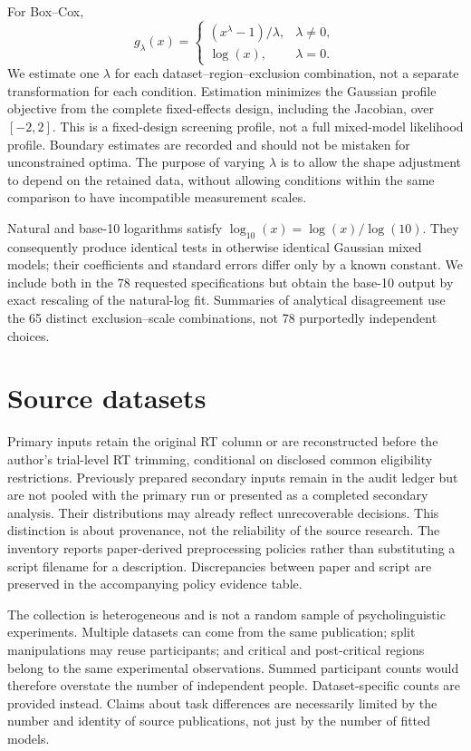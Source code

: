 For Box--Cox,
\[
 g_\lambda(x)=
 \begin{cases}
  (x^\lambda-1)/\lambda,&\lambda\neq0,\\
  \log(x),&\lambda=0.
 \end{cases}
\]
We estimate one \(\lambda\) for each dataset--region--exclusion combination,
not a separate transformation for each condition. Estimation minimizes the
Gaussian profile objective from the complete fixed-effects design, including
the Jacobian, over \([-2,2]\). This is a fixed-design screening profile,
not a full mixed-model likelihood profile. Boundary estimates are recorded
and should not be mistaken for unconstrained optima. The purpose of varying
\(\lambda\) is to allow the shape adjustment to depend on the retained data,
without allowing conditions within the same comparison to have incompatible
measurement scales.

Natural and base-10 logarithms satisfy
\(\log_{10}(x)=\log(x)/\log(10)\). They consequently produce identical
tests in otherwise identical Gaussian mixed models; their coefficients and
standard errors differ only by a known constant. We include both in the
78 requested specifications but obtain the base-10 output by exact
rescaling of the natural-log fit. Summaries of analytical disagreement use
the 65 distinct exclusion--scale combinations, not 78 purportedly independent
choices.

\section{Source datasets}



Primary inputs retain the original RT column or are reconstructed before the
author's trial-level RT trimming, conditional on disclosed common eligibility
restrictions. Previously prepared secondary inputs remain in the audit ledger
but are not pooled with the primary run or presented as a completed secondary
analysis. Their distributions may already reflect unrecoverable decisions.
This distinction is about provenance, not the reliability of the source
research. The inventory reports paper-derived preprocessing policies rather
than substituting a script filename for a description. Discrepancies between
paper and script are preserved in the accompanying policy evidence table.

The collection is heterogeneous and is not a random sample of
psycholinguistic experiments. Multiple datasets can come from the same
publication; split manipulations may reuse participants; and critical and
post-critical regions belong to the same experimental observations.
Summed participant counts would therefore overstate the number of
independent people. Dataset-specific counts are provided instead. Claims
about task differences are necessarily limited by the number and identity
of source publications, not just by the number of fitted models.


